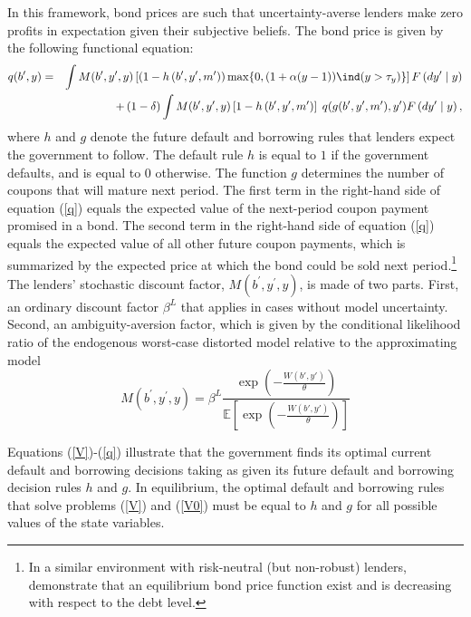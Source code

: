 In this framework, bond prices are such that uncertainty-averse lenders make zero profits in expectation given their subjective beliefs. The bond price is given by the following functional equation:
\begin{eqnarray}
q(b^{\prime },y) &=&\int M(b^\prime, y^{\prime },y)\left[ (1-h\left(b^{\prime}, y^{\prime}, m' \right))\max \{0,  (1+\alpha(y-1)) \ind (y > \tau_y) \} \right] F\left( dy^{\prime }\mid
y\right) \notag
\\
&&+\left(1-\delta\right) \int M(b^\prime, y^{\prime },y)\left[ 1-h\left(
b^{\prime}, y^{\prime}, m' \right) \right] \;q(g(b^{\prime },y^{\prime }, m'),y^{\prime })F\left( dy^{\prime }\mid
y\right), \label{q}
\end{eqnarray}%
where $h$ and $g$ denote the future default and borrowing rules that lenders expect the government to follow.  The default rule $h$ is equal to $1$ if the government defaults, and is equal to $0$ otherwise. The function $g$ determines the number of coupons that will mature next period. The first term in the right-hand side of equation (\ref{q}) equals the expected value of the next-period coupon payment promised in a bond. The second term in the right-hand side of equation (\ref{q}) equals the expected value of all other future coupon payments, which is summarized by the expected price at which the bond could be sold next period.\footnote{In a similar environment with risk-neutral (but non-robust) lenders, \cite{Chatty} demonstrate that an equilibrium bond price function exist and is decreasing with respect to the debt level.} The lenders' stochastic discount factor, $M(b^\prime, y^\prime,y)$, is made of two parts. First, an ordinary discount factor $\beta^L$ that applies in cases without model uncertainty. Second, an ambiguity-aversion factor, which is given by the conditional likelihood ratio of the endogenous worst-case distorted model relative to the approximating model
\begin{equation}
M(b^\prime, y^{\prime },y) = \beta^L \frac{\exp\left(-\frac{W(b',y')}{\theta}\right)}{\mathbb{E}\left[\exp\left(-\frac{W(b',y')}{\theta}\right)\right]}
\end{equation}

Equations (\ref{V})-(\ref{q}) illustrate that the government finds its optimal current default and borrowing decisions taking as given
its future default and borrowing decision rules $h$ and $g$. In equilibrium, the optimal default and borrowing rules that solve
problems (\ref{V}) and (\ref{V0}) must be equal to $h$ and $g$ for all possible values of the state variables.


